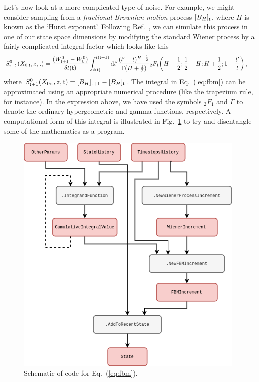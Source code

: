 Let's now look at a more complicated type of noise. For example, we might consider sampling from a \emph{fractional Brownian motion} process $[B_{H}]_{\sf t}$, where $H$ is known as the `Hurst exponent'. Following Ref.~\cite{decreusefond1999stochastic}, we can simulate this process in one of our state space dimensions by modifying the standard Wiener process by a fairly complicated integral factor which looks like this
\begin{align}
S^{0}_{{\sf t}+1}(X_{0:{\sf t}},z,{\sf t}) &= \frac{(W^0_{{\sf t}+1} - W^0_{\sf t})}{\delta t({\sf t})}\int^{t({\sf t}+1)}_{t({\sf t})}{\rm d}t' \frac{(t'-t)^{H-\frac{1}{2}}}{\Gamma (H+\frac{1}{2})} {}_2F_1 \bigg( H-\frac{1}{2};\frac{1}{2}-H;H+\frac{1}{2};1-\frac{t'}{t}\bigg) \label{eq:fbm} \,,
\end{align}
where $S^{0}_{{\sf t}+1}(X_{0:{\sf t}},z,{\sf t})=[B_{H}]_{{\sf t}+1}-[B_{H}]_{{\sf t}}$. The integral in Eq.~(\ref{eq:fbm}) can be approximated using an appropriate numerical procedure (like the trapezium rule, for instance). In the expression above, we have used the symbols ${}_2F_1$ and $\Gamma$ to denote the ordinary hypergeometric and gamma functions, respectively. A computational form of this integral is illustrated in Fig.~\ref{fig:fractional-brownian-motion} to try and disentangle some of the mathematics as a program.

\begin{figure}[h]
\centering
\includegraphics[width=11cm]{images/chapter-1-fractional-brownian-motion.drawio.png}
\caption{Schematic of code for Eq.~(\ref{eq:fbm}).}
\label{fig:fractional-brownian-motion}
\end{figure}

